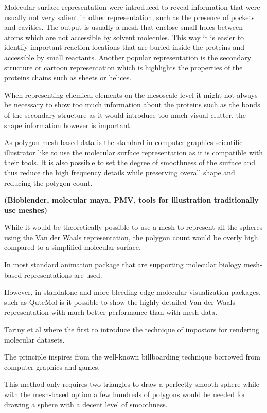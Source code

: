 Molecular surface representation were introduced to reveal information that were usually not very salient in other representation, such as the presence of pockets and cavities.
The output is usually a mesh that enclose small holes between atoms which are not accessible by solvent molecules.
This way it is easier to identify important reaction locations that are buried inside the proteins and accessible by small reactants.
Another popular representation is the secondary structure or cartoon representation which is highlights the properties of the proteins chains such as sheets or helices.

When representing chemical elements on the mesoscale level it might not always be necessary to show too much information about the proteins such as the bonds of the secondary structure as it would introduce too much visual clutter, the shape information however is important.

As polygon mesh-based data is the standard in computer graphics scientific illustrator like to use the molecular surface representation as it is compatible with their tools.
It is also possible to set the degree of smoothness of the surface and thus reduce the high frequency details while preserving overall shape and reducing the polygon count.

\textbf{(Bioblender, molecular maya, PMV, tools for illustration traditionally use meshes)}

While it would be theoretically possible to use a mesh to represent all the spheres using the Van der Waals representation, the polygon count would be overly high compared to a simplified molecular surface.

In most standard animation package that are supporting molecular biology mesh-based representations are used.

However, in standalone and more bleeding edge molecular visualization packages, such as QuteMol is it possible to show the highly detailed Van der Waals representation with much better performance than with mesh data.

Tariny et al where the first to introduce the technique of impostors for rendering molecular datasets. 

The principle inspires from the well-known billboarding technique borrowed from computer graphics and games. 

This method only requires two triangles to draw a perfectly smooth sphere while with the mesh-based option a few hundreds of polygons would be needed for drawing a sphere with a decent level of smoothness.










